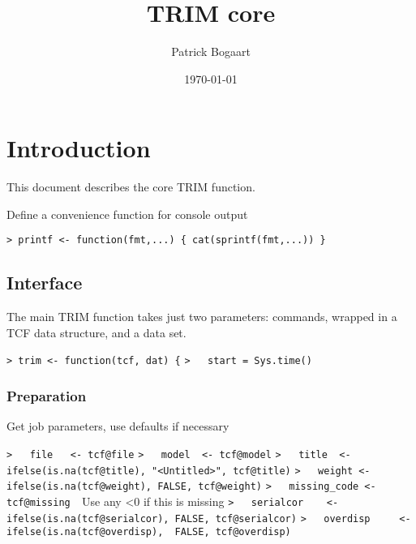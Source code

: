 \documentclass[a4paper]{article}
\begin{document}
\let\Sum=\sum
\newcommand{\diag}[1]{\operatorname{diag}(#1)}
\newcommand{\var}[1]{\operatorname{var}(#1)}
\newcommand{\cov}[1]{\operatorname{cov}(#1)}
\newcommand{\se}[1]{\operatorname{S.E.}(#1)}
\newcommand{\Mu}{{\mu_{+}}} 

\title{TRIM core}
\author{Patrick Bogaart}
\date{\today}
\section{Introduction}
This document describes the core TRIM function.\par

Define a convenience function for console output\par
\verb~> printf <- function(fmt,...) { cat(sprintf(fmt,...)) }~\par



\subsection{Interface}\par

The main TRIM function takes just two parameters:
commands, wrapped in a TCF data structure,
and a data set.\par
\verb~> trim <- function(tcf, dat) {~\newline
\verb~>   start = Sys.time()~\par



\subsubsection{Preparation}\par

Get job parameters, use defaults if necessary\par
\verb~>   file   <- tcf@file~\newline
\verb~>   model  <- tcf@model~\newline
\verb~>   title  <- ifelse(is.na(tcf@title), "<Untitled>", tcf@title)~\newline
\verb~>   weight <- ifelse(is.na(tcf@weight), FALSE, tcf@weight)~\newline
\verb~>   missing_code <- tcf@missing  ~{\sffamily Use any <0 if this is missing}\newline
\verb~>   serialcor    <- ifelse(is.na(tcf@serialcor), FALSE, tcf@serialcor)~\newline
\verb~>   overdisp     <- ifelse(is.na(tcf@overdisp),  FALSE, tcf@overdisp)~\par
\end{document}
